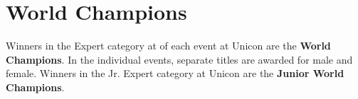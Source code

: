 \section{World Champions \label{sec:freestyle_world-champions}}
Winners in the Expert category at of each event at Unicon are the \textbf{World Champions}.
In the individual events, separate titles are awarded for male and female.
Winners in the Jr. Expert category at Unicon are the \textbf{Junior World Champions}.


